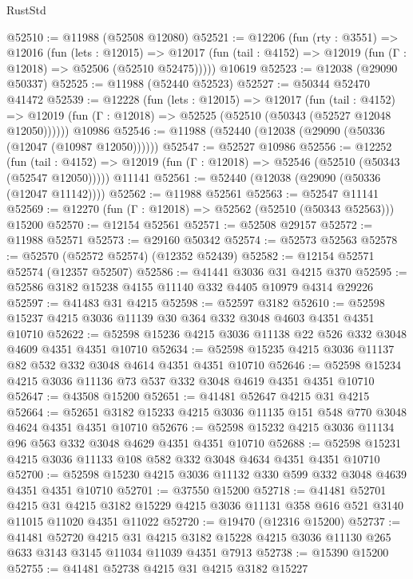 \begin{lexlean}{RustStd}
\begin{coremodule}
@52510 := @11988 (@52508 @12080)
@52521 := @12206
    (fun (rty : @3551) =>
    @12016
      (fun (lets : @12015) =>
      @12017 (fun (tail : @4152) => @12019 (fun (Γ : @12018) => @52506 (@52510 @52475)))))
    @10619
@52523 := @12038 (@29090 @50337)
@52525 := @11988 (@52440 @52523)
@52527 := @50344 @52470 @41472
@52539 := @12228
    (fun (lets : @12015) =>
    @12017
      (fun (tail : @4152) =>
      @12019 (fun (Γ : @12018) => @52525 (@52510 (@50343 (@52527 @12048 @12050))))))
    @10986
@52546 := @11988 (@52440 (@12038 (@29090 (@50336 (@12047 (@10987 @12050))))))
@52547 := @52527 @10986
@52556 := @12252
    (fun (tail : @4152) => @12019 (fun (Γ : @12018) => @52546 (@52510 (@50343 (@52547 @12050)))))
    @11141
@52561 := @52440 (@12038 (@29090 (@50336 (@12047 @11142))))
@52562 := @11988 @52561
@52563 := @52547 @11141
@52569 := @12270 (fun (Γ : @12018) => @52562 (@52510 (@50343 @52563))) @15200
@52570 := @12154 @52561
@52571 := @52508 @29157
@52572 := @11988 @52571
@52573 := @29160 @50342
@52574 := @52573 @52563
@52578 := @52570 (@52572 @52574) (@12352 @52439)
@52582 := @12154 @52571 @52574 (@12357 @52507)
@52586 := @41441 @3036 @31 @4215 @370
@52595 := @52586 @3182 @15238 @4155 @11140 @332 @4405 @10979 @4314 @29226
@52597 := @41483 @31 @4215
@52598 := @52597 @3182
@52610 := @52598 @15237 @4215 @3036 @11139 @30 @364 @332 @3048 @4603 @4351 @4351 @10710
@52622 := @52598 @15236 @4215 @3036 @11138 @22 @526 @332 @3048 @4609 @4351 @4351 @10710
@52634 := @52598 @15235 @4215 @3036 @11137 @82 @532 @332 @3048 @4614 @4351 @4351 @10710
@52646 := @52598 @15234 @4215 @3036 @11136 @73 @537 @332 @3048 @4619 @4351 @4351 @10710
@52647 := @43508 @15200
@52651 := @41481 @52647 @4215 @31 @4215
@52664 := @52651 @3182 @15233 @4215 @3036 @11135 @151 @548 @770 @3048 @4624 @4351 @4351 @10710
@52676 := @52598 @15232 @4215 @3036 @11134 @96 @563 @332 @3048 @4629 @4351 @4351 @10710
@52688 := @52598 @15231 @4215 @3036 @11133 @108 @582 @332 @3048 @4634 @4351 @4351 @10710
@52700 := @52598 @15230 @4215 @3036 @11132 @330 @599 @332 @3048 @4639 @4351 @4351 @10710
@52701 := @37550 @15200
@52718 := @41481
    @52701
    @4215
    @31
    @4215
    @3182
    @15229
    @4215
    @3036
    @11131
    @358
    @616
    @521
    @3140
    @11015
    @11020
    @4351
    @11022
@52720 := @19470 (@12316 @15200)
@52737 := @41481
    @52720
    @4215
    @31
    @4215
    @3182
    @15228
    @4215
    @3036
    @11130
    @265
    @633
    @3143
    @3145
    @11034
    @11039
    @4351
    @7913
@52738 := @15390 @15200
@52755 := @41481
    @52738
    @4215
    @31
    @4215
    @3182
    @15227

\end{coremodule}
\end{lexlean}
